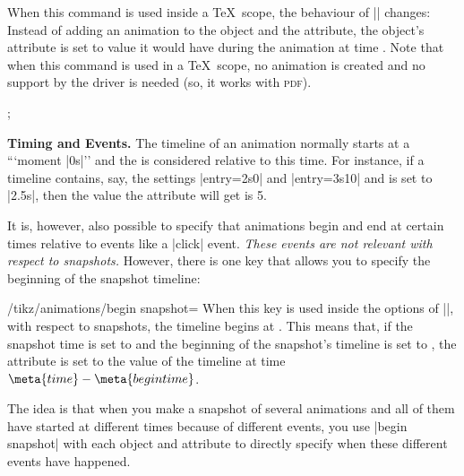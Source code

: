 \begin{command}{\pgfsnapshot{}}
    When this command is used inside a \TeX\ scope, the behaviour of
    |\pgfanimateattribute| changes: Instead of adding an animation to the
    object and the attribute, the object's attribute is set to value it would
    have during the animation at time . Note that when this command
    is used in a \TeX\ scope, no animation is created and no support by the
    driver is needed (so, it works with \textsc{pdf}).
\begin{codeexample}[preamble={\usetikzlibrary{animations}}]
\tikz [make snapshot of=1s,
       animate = { myself: = {
         :rotate = { 0s = "0", 2s = "90" },
         :color  = { 0s = "red", 2s = "green" },
         :line width = { 0s = "0mm", 4s = "4mm" }
       }}]
  ;
\end{codeexample}


    \medskip\textbf{Timing and Events.}
    The timeline of an animation normally starts at a ```moment |0s|'' and the
     is considered relative to this time. For instance, if a
    timeline contains, say, the settings |entry={2s}{0}| and |entry={3s}{10}|
    and  is set to |2.5s|, then the value the attribute will get is
    5.

    It is, however, also possible to specify that animations begin and end at
    certain times relative to events like a |click| event. \emph{These events
    are not relevant with respect to snapshots.} However, there is one key that
    allows you to specify the beginning of the snapshot timeline:
    \begin{key}{/tikz/animations/begin snapshot=}
        When this key is used inside the options of |\pgfanimateattribute|,
        with respect to snapshots, the timeline begins at .
        This means that, if the snapshot time is set to  and the
        beginning of the snapshot's timeline is set to , the
        attribute is set to the value of the timeline at time $\meta{time} -
        \meta{begin time}$.

        The idea is that when you make a snapshot of several animations and all
        of them have started at different times because of different events,
        you use |begin snapshot| with each object and attribute to directly
        specify when these different events have happened.
    \end{key}


\end{command}
